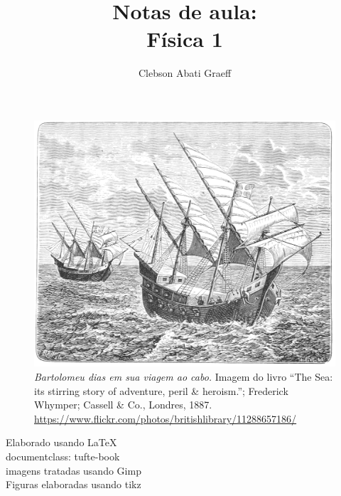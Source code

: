 \documentclass[justified,a4paper,symmetric,nobib,notoc]{tufte-book}
\title{Notas de aula: \\ Física 1}
\author{Clebson Abati Graeff}
\begin{document}



\mainmatter

%
%




%
%
%
%

\printbibliography

\cleardoublepage
\thispagestyle{empty}
\begin{figure}
\centering
\includegraphics{Fig/Caravelas.png}
\caption{\emph{Bartolomeu dias em sua viagem ao cabo.} Imagem do livro ``The Sea: its stirring story of adventure, peril \& heroism.''; Frederick Whymper; Cassell \& Co., Londres, 1887. \url{https://www.flickr.com/photos/britishlibrary/11288657186/}}
\end{figure}
\vfill
\begin{fullwidth}
\begin{center}\sc
Elaborado usando \LaTeX \\
documentclass: tufte-book \\
imagens tratadas usando Gimp \\
Figuras elaboradas usando tikz
\end{center}
\end{fullwidth}
\end{document}
